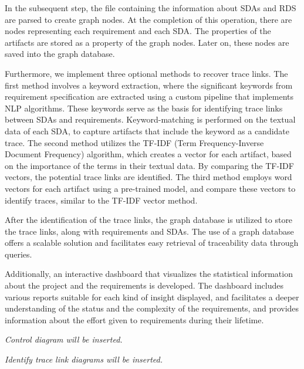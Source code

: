 \documentclass[conference]{IEEEtran}
\begin{document}
In the subsequent step, the file containing the information about SDAs and RDS are parsed to create graph nodes. At the completion of this operation, there are nodes representing each requirement and each SDA. The properties of the artifacts are stored as a property of the graph nodes. Later on, these nodes are saved into the graph database.

Furthermore, we implement three optional methods to recover trace links. The first method involves a keyword extraction, where the significant keywords from requirement specification are extracted using a custom pipeline that implements NLP algorithms. These keywords serve as the basis for identifying trace links between SDAs and requirements. Keyword-matching is performed on the textual data of each SDA, to capture artifacts that include the keyword as a candidate trace. The second method utilizes the TF-IDF (Term Frequency-Inverse Document Frequency) algorithm, which creates a vector for each artifact, based on the importance of the terms in their textual data. By comparing the TF-IDF vectors, the potential trace links are identified. The third method employs word vectors for each artifact using a pre-trained model, and compare these vectors to identify traces, similar to the TF-IDF vector method. 

After the identification of the trace links, the graph database is utilized to store the trace links, along with requirements and SDAs. The use of a graph database offers a scalable solution and facilitates easy retrieval of traceability data through queries. 

Additionally, an interactive dashboard that visualizes the statistical information about the project and the requirements is developed. The dashboard includes various reports suitable for each kind of insight displayed, and facilitates a deeper understanding of the status and the complexity of the requirements, and provides information about the effort given to requirements during their lifetime.

\textit{Control diagram will be inserted.}

\textit{Identify trace link diagrams will be inserted.}

\end{document}
